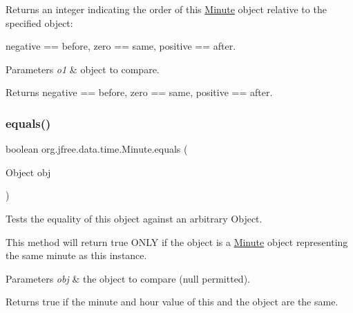 Returns an integer indicating the order of this \mbox{\hyperlink{classorg_1_1jfree_1_1data_1_1time_1_1_minute}{Minute}} object relative to the specified object\+:

negative == before, zero == same, positive == after.


\begin{DoxyParams}{Parameters}
{\em o1} & object to compare.\\
\hline
\end{DoxyParams}
\begin{DoxyReturn}{Returns}
negative == before, zero == same, positive == after. 
\end{DoxyReturn}
\mbox{\label{classorg_1_1jfree_1_1data_1_1time_1_1_minute_a97bfcf2b86465b2ab88cf1d709c2753b}} 
\subsubsection{\texorpdfstring{equals()}{equals()}}
{\footnotesize\ttfamily boolean org.\+jfree.\+data.\+time.\+Minute.\+equals (\begin{DoxyParamCaption}\item[{Object}]{obj }\end{DoxyParamCaption})}

Tests the equality of this object against an arbitrary Object. 

This method will return true O\+N\+LY if the object is a \mbox{\hyperlink{classorg_1_1jfree_1_1data_1_1time_1_1_minute}{Minute}} object representing the same minute as this instance.


\begin{DoxyParams}{Parameters}
{\em obj} & the object to compare ({\ttfamily null} permitted).\\
\hline
\end{DoxyParams}
\begin{DoxyReturn}{Returns}
{\ttfamily true} if the minute and hour value of this and the object are the same. 
\end{DoxyReturn}
\mbox{\label{classorg_1_1jfree_1_1data_1_1time_1_1_minute_a336df021712c77e53a50cf14aa840906}} 
